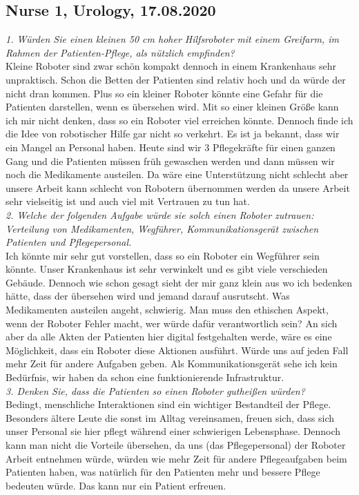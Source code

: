\documentclass[plainarticle,zihtitle,english,final,hyperref,utf8]{zihpub}
\begin{document}
\begin{appendices}
\subsection{Nurse 1, Urology, 17.08.2020}
\textit{1. Würden Sie einen kleinen 50 cm hoher Hilfsroboter mit einem Greifarm, im Rahmen der Patienten-Pflege, als nützlich empfinden?}\\
\newline
Kleine Roboter sind zwar schön kompakt dennoch in einem Krankenhaus sehr unpraktisch. Schon die Betten der Patienten sind relativ hoch und da würde der nicht dran kommen. Plus so ein kleiner Roboter könnte eine Gefahr für die Patienten darstellen, wenn es übersehen wird. Mit so einer kleinen Größe kann ich mir nicht denken, dass so ein Roboter viel erreichen könnte. Dennoch finde ich die Idee von robotischer Hilfe gar nicht so verkehrt. Es ist ja bekannt, dass wir ein Mangel an Personal haben. Heute sind wir 3 Pflegekräfte für einen ganzen Gang und die Patienten müssen früh gewaschen werden und dann müssen wir noch die Medikamente austeilen. Da wäre eine Unterstützung nicht schlecht aber unsere Arbeit kann schlecht von Robotern übernommen werden da unsere Arbeit sehr vielseitig ist und auch viel mit Vertrauen zu tun hat.\\
\newline
\textit{2. Welche der folgenden Aufgabe würde sie solch einen Roboter zutrauen: Verteilung von Medikamenten, Wegführer, Kommunikationsgerät zwischen Patienten und Pflegepersonal.}\\
\newline
Ich könnte mir sehr gut vorstellen, dass so ein Roboter ein Wegführer sein könnte. Unser Krankenhaus ist sehr verwinkelt und es gibt viele verschieden Gebäude. Dennoch wie schon gesagt sieht der mir ganz klein aus wo ich bedenken hätte, dass der übersehen wird und jemand darauf ausrutscht. Was Medikamenten austeilen angeht, schwierig. Man muss den ethischen Aspekt, wenn der Roboter Fehler macht, wer würde dafür verantwortlich sein? An sich aber da alle Akten der Patienten hier digital festgehalten werde, wäre es eine Möglichkeit, dass ein Roboter diese Aktionen ausführt. Würde uns auf jeden Fall mehr Zeit für andere Aufgaben geben. Als Kommunikationsgerät sehe ich kein Bedürfnis, wir haben da schon eine funktionierende Infrastruktur.\\
\newline
\textit{3. Denken Sie, dass die Patienten so einen Roboter gutheißen würden?}\\
\newline
Bedingt, menschliche Interaktionen sind ein wichtiger Bestandteil der Pflege. Besonders ältere Leute die sonst im Alltag vereinsamen, freuen sich, dass sich unser Personal sie hier pflegt während einer schwierigen Lebensphase. Dennoch kann man nicht die Vorteile übersehen, da uns (das Pflegepersonal) der Roboter Arbeit entnehmen würde, würden wie mehr Zeit für andere Pflegeaufgaben beim Patienten haben, was natürlich für den Patienten mehr und bessere Pflege bedeuten würde. Das kann nur ein Patient erfreuen.

\end{appendices}
\end{document}
